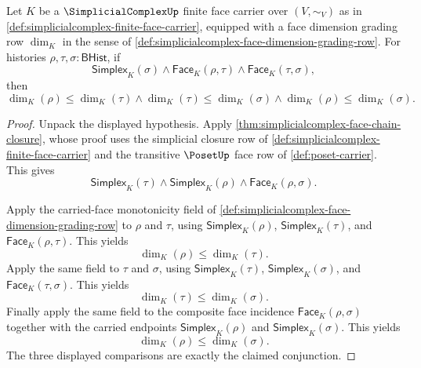 \begin{theorem}
\label{thm:simplicialcomplex-face-chain-dimension-monotonicity}
Let $K$ be a $\SimplicialComplexUp$ finite face carrier over $(V,\sim_V)$ as in \autoref{def:simplicialcomplex-finite-face-carrier}, equipped with a face dimension grading row $\dim_K$ in the sense of \autoref{def:simplicialcomplex-face-dimension-grading-row}. For histories $\rho,\tau,\sigma:\mathsf{BHist}$, if
$$
\mathsf{Simplex}_K(\sigma)
\land
\mathsf{Face}_K(\rho,\tau)
\land
\mathsf{Face}_K(\tau,\sigma),
$$
then
$$
\dim_K(\rho)\le\dim_K(\tau)
\land
\dim_K(\tau)\le\dim_K(\sigma)
\land
\dim_K(\rho)\le\dim_K(\sigma).
$$
\end{theorem}
\begin{proof}
Unpack the displayed hypothesis. Apply \autoref{thm:simplicialcomplex-face-chain-closure}, whose proof uses the simplicial closure row of \autoref{def:simplicialcomplex-finite-face-carrier} and the transitive $\PosetUp$ face row of \autoref{def:poset-carrier}. This gives
$$
\mathsf{Simplex}_K(\tau)
\land
\mathsf{Simplex}_K(\rho)
\land
\mathsf{Face}_K(\rho,\sigma).
$$

Apply the carried-face monotonicity field of \autoref{def:simplicialcomplex-face-dimension-grading-row} to $\rho$ and $\tau$, using $\mathsf{Simplex}_K(\rho)$, $\mathsf{Simplex}_K(\tau)$, and $\mathsf{Face}_K(\rho,\tau)$. This yields
$$
\dim_K(\rho)\le\dim_K(\tau).
$$
Apply the same field to $\tau$ and $\sigma$, using $\mathsf{Simplex}_K(\tau)$, $\mathsf{Simplex}_K(\sigma)$, and $\mathsf{Face}_K(\tau,\sigma)$. This yields
$$
\dim_K(\tau)\le\dim_K(\sigma).
$$
Finally apply the same field to the composite face incidence $\mathsf{Face}_K(\rho,\sigma)$ together with the carried endpoints $\mathsf{Simplex}_K(\rho)$ and $\mathsf{Simplex}_K(\sigma)$. This yields
$$
\dim_K(\rho)\le\dim_K(\sigma).
$$
The three displayed comparisons are exactly the claimed conjunction.
\end{proof}


